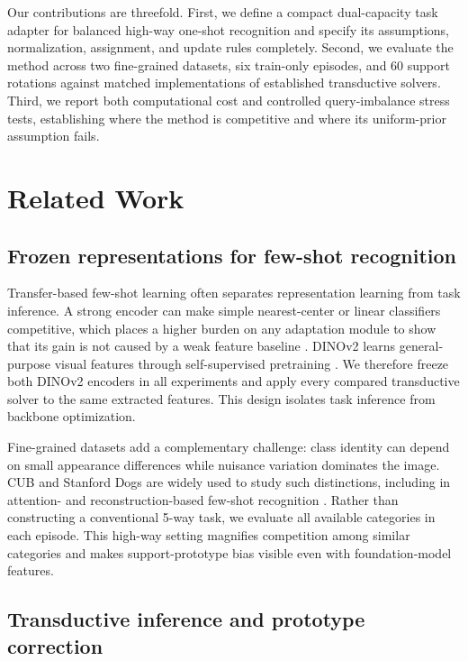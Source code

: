 \documentclass[10pt,twocolumn]{article}
\begin{document}
Our contributions are threefold. First, we define a compact dual-capacity task
adapter for balanced high-way one-shot recognition and specify its assumptions,
normalization, assignment, and update rules completely. Second, we evaluate the
method across two fine-grained datasets, six train-only episodes, and 60 support
rotations against matched implementations of established transductive solvers.
Third, we report both computational cost and controlled query-imbalance stress
tests, establishing where the method is competitive and where its uniform-prior
assumption fails.

\section{Related Work}
\label{sec:related}

\subsection{Frozen representations for few-shot recognition}

Transfer-based few-shot learning often separates representation learning from
task inference. A strong encoder can make simple nearest-center or linear
classifiers competitive, which places a higher burden on any adaptation module
to show that its gain is not caused by a weak feature baseline
\cite{closerlook,goodembedding,simpleshot}. DINOv2 learns
general-purpose visual features through self-supervised pretraining
\cite{dinov2}. We therefore freeze both DINOv2 encoders in all experiments and
apply every compared transductive solver to the same extracted features. This
design isolates task inference from backbone optimization.

Fine-grained datasets add a complementary challenge: class identity can depend
on small appearance differences while nuisance variation dominates the image.
CUB \cite{cubdataset} and Stanford Dogs \cite{stanforddogs} are widely used to
study such distinctions, including in attention- and reconstruction-based
few-shot recognition \cite{mamlfgvc,dualattention,bfrn}. Rather than
constructing a conventional 5-way task,
we evaluate all available categories in each episode. This high-way setting
magnifies competition among similar categories and makes support-prototype bias
visible even with foundation-model features.

\subsection{Transductive inference and prototype correction}
\end{document}
